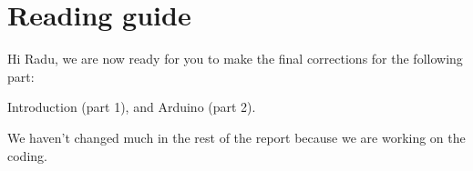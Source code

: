 \section{Reading guide}
Hi Radu, we are now ready for you to make the final corrections for the following part:

Introduction (part 1), and Arduino (part 2).

We haven't changed much in the rest of the report because we are working on the coding.